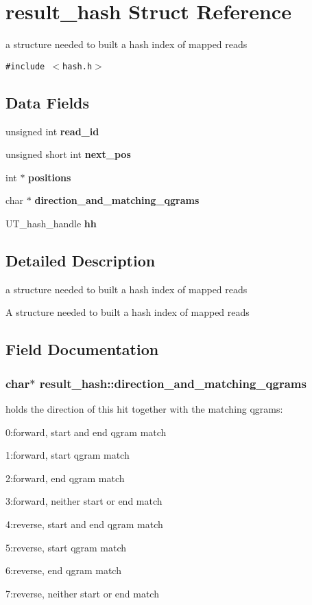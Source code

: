 \section{result\_\-hash Struct Reference}
\label{structresult__hash}
a structure needed to built a hash index of mapped reads  


{\tt \#include $<$hash.h$>$}

\subsection*{Data Fields}
\begin{CompactItemize}
\item 
unsigned int {\bf read\_\-id}
\item 
unsigned short int {\bf next\_\-pos}
\item 
int $\ast$ {\bf positions}
\item 
char $\ast$ {\bf direction\_\-and\_\-matching\_\-qgrams}
\item 
UT\_\-hash\_\-handle {\bf hh}
\end{CompactItemize}


\subsection{Detailed Description}
a structure needed to built a hash index of mapped reads 

A structure needed to built a hash index of mapped reads 

\subsection{Field Documentation}
\subsubsection[{direction\_\-and\_\-matching\_\-qgrams}]{\setlength{\rightskip}{0pt plus 5cm}char$\ast$ {\bf result\_\-hash::direction\_\-and\_\-matching\_\-qgrams}}\label{structresult__hash_c518b7f3335ab4784924bfe341108d81}


holds the direction of this hit together with the matching qgrams:\par
 0:forward, start and end qgram match\par
 1:forward, start qgram match\par
 2:forward, end qgram match\par
 3:forward, neither start or end match\par
 4:reverse, start and end qgram match\par
 5:reverse, start qgram match\par
 6:reverse, end qgram match\par
 7:reverse, neither start or end match 

